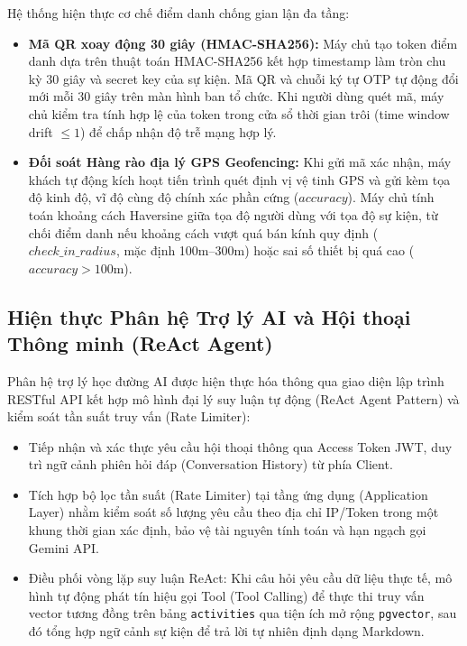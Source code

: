 Hệ thống hiện thực cơ chế điểm danh chống gian lận đa tầng:
\begin{itemize}[leftmargin=*]
    \item \textbf{Mã QR xoay động 30 giây (HMAC-SHA256):} Máy chủ tạo token điểm danh dựa trên thuật toán HMAC-SHA256 kết hợp timestamp làm tròn chu kỳ 30 giây và secret key của sự kiện. Mã QR và chuỗi ký tự OTP tự động đổi mới mỗi 30 giây trên màn hình ban tổ chức. Khi người dùng quét mã, máy chủ kiểm tra tính hợp lệ của token trong cửa sổ thời gian trôi (time window drift $\le 1$) để chấp nhận độ trễ mạng hợp lý.
    \item \textbf{Đối soát Hàng rào địa lý GPS Geofencing:} Khi gửi mã xác nhận, máy khách tự động kích hoạt tiến trình quét định vị vệ tinh GPS và gửi kèm tọa độ kinh độ, vĩ độ cùng độ chính xác phần cứng ($accuracy$). Máy chủ tính toán khoảng cách Haversine giữa tọa độ người dùng với tọa độ sự kiện, từ chối điểm danh nếu khoảng cách vượt quá bán kính quy định ($check\_in\_radius$, mặc định 100m--300m) hoặc sai số thiết bị quá cao ($accuracy > 100$m).
\end{itemize}

\subsection{Hiện thực Phân hệ Trợ lý AI và Hội thoại Thông minh (ReAct Agent)}

Phân hệ trợ lý học đường AI được hiện thực hóa thông qua giao diện lập trình RESTful API kết hợp mô hình đại lý suy luận tự động (ReAct Agent Pattern) và kiểm soát tần suất truy vấn (Rate Limiter):
\begin{itemize}[leftmargin=*]
    \item Tiếp nhận và xác thực yêu cầu hội thoại thông qua Access Token JWT, duy trì ngữ cảnh phiên hỏi đáp (Conversation History) từ phía Client.
    \item Tích hợp bộ lọc tần suất (Rate Limiter) tại tầng ứng dụng (Application Layer) nhằm kiểm soát số lượng yêu cầu theo địa chỉ IP/Token trong một khung thời gian xác định, bảo vệ tài nguyên tính toán và hạn ngạch gọi Gemini API.
    \item Điều phối vòng lặp suy luận ReAct: Khi câu hỏi yêu cầu dữ liệu thực tế, mô hình tự động phát tín hiệu gọi Tool (Tool Calling) để thực thi truy vấn vector tương đồng trên bảng \texttt{activities} qua tiện ích mở rộng \texttt{pgvector}, sau đó tổng hợp ngữ cảnh sự kiện để trả lời tự nhiên định dạng Markdown.
\end{itemize}

